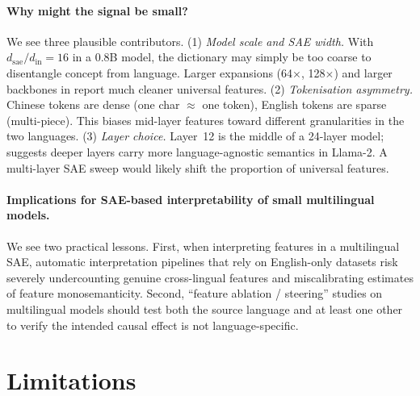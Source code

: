 \documentclass[11pt,a4paper]{article}
\begin{document}
\paragraph{Why might the signal be small?}
We see three plausible contributors. (1) \emph{Model scale and SAE width.}
With $d_\text{sae}/d_\text{in}=16$ in a 0.8B model, the dictionary may simply
be too coarse to disentangle concept from language. Larger expansions
(64$\times$, 128$\times$) and larger backbones in
\cite{templeton2024scalingmonosemanticity} report much cleaner universal
features. (2) \emph{Tokenisation asymmetry.} Chinese tokens are dense (one
char $\approx$ one token), English tokens are sparse (multi-piece). This
biases mid-layer features toward different granularities in the two languages.
(3) \emph{Layer choice.} Layer~12 is the middle of a 24-layer model;
\cite{wendler2024llamasenglish} suggests deeper layers carry more
language-agnostic semantics in Llama-2. A multi-layer SAE sweep would likely
shift the proportion of universal features.

\paragraph{Implications for SAE-based interpretability of small multilingual models.}
We see two practical lessons. First, when interpreting features in a
multilingual SAE, automatic interpretation pipelines that rely on
English-only datasets risk severely undercounting genuine cross-lingual
features and miscalibrating estimates of feature monosemanticity.
Second, ``feature ablation / steering'' studies on multilingual models
should test both the source language and at least one other to verify the
intended causal effect is not language-specific.

\section{Limitations}
\end{document}
